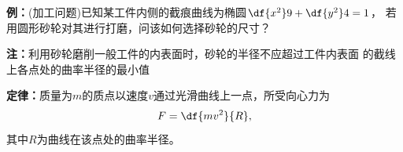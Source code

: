 \begin{center}
\end{center}

{\bf 例：}(加工问题)已知某工件内侧的截痕曲线为椭圆$\df{x^2}9+\df{y^2}4=1$，
若用圆形砂轮对其进行打磨，问该如何选择砂轮的尺寸？

{\bf 注：}利用砂轮磨削一般工件的内表面时，砂轮的半径不应超过工件内表面
的截线上各点处的曲率半径的最小值

{\bf 定律：}质量为$m$的质点以速度$v$通过光滑曲线上一点，所受向心力为
$$F=\df{mv^2}{R},$$
其中$R$为曲线在该点处的曲率半径。

\begin{center}
\end{center}

